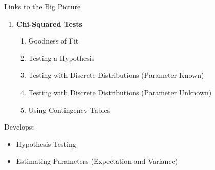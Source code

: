 \documentclass[fleqn]{article}
\newcommand{\bookletunittitle}{Chi-Squared Tests}                %
\newcommand{\unitprefix}{FS}                                     %
\begin{document}
\begin{mybox2}[colbacktitle=WildStrawberry]{Links to the Big Picture}
    \begin{enumerate}[label*=\bfseries \unitprefix\arabic*., leftmargin=*]
        \item \textbf{\bookletunittitle}
        \begin{enumerate}[label*=\bfseries\arabic*]
            \item Goodness of Fit
            \item Testing a Hypothesis
            \item Testing with Discrete Distributions (Parameter Known)
            \item Testing with Discrete Distributions (Parameter Unknown)
            \item Using Contingency Tables
        \end{enumerate}
    \end{enumerate}
    Develops:
    \begin{itemize}
        \item Hypothesis Testing
        \item Estimating Parameters (Expectation and Variance)
    \end{itemize}
    \vspace{1mm}
\end{mybox2}

\newpage
\pagestyle{branded}



\end{document}
